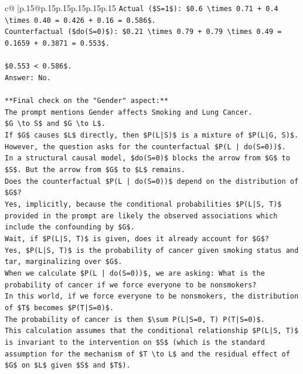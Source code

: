 \documentclass{article}
\begin{document}
{\begin{supertabular}{c@{$\;$}|p{.15\linewidth}@{}p{.15\linewidth}p{.15\linewidth}p{.15\linewidth}p{.15\linewidth}p{.15\linewidth}}
{{{\texttt{Actual (\$S=1\$): \$0.6 \textbackslash{}times 0.71 + 0.4 \textbackslash{}times 0.40 = 0.426 + 0.16 = 0.586\$.} \\
\texttt{Counterfactual (\$do(S=0)\$): \$0.21 \textbackslash{}times 0.79 + 0.79 \textbackslash{}times 0.49 = 0.1659 + 0.3871 = 0.553\$.} \\
\\ 
\texttt{\$0.553 < 0.586\$.} \\
\texttt{Answer: No.} \\
\\ 
\texttt{**Final check on the "Gender" aspect:**} \\
\texttt{The prompt mentions Gender affects Smoking and Lung Cancer.} \\
\texttt{\$G \textbackslash{}to S\$ and \$G \textbackslash{}to L\$.} \\
\texttt{If \$G\$ causes \$L\$ directly, then \$P(L|S)\$ is a mixture of \$P(L|G, S)\$.} \\
\texttt{However, the question asks for the counterfactual \$P(L | do(S=0))\$.} \\
\texttt{In a structural causal model, \$do(S=0)\$ blocks the arrow from \$G\$ to \$S\$. But the arrow from \$G\$ to \$L\$ remains.} \\
\texttt{Does the counterfactual \$P(L | do(S=0))\$ depend on the distribution of \$G\$?} \\
\texttt{Yes, implicitly, because the conditional probabilities \$P(L|S, T)\$ provided in the prompt are likely the observed associations which include the confounding by \$G\$.} \\
\texttt{Wait, if \$P(L|S, T)\$ is given, does it already account for \$G\$?} \\
\texttt{Yes, \$P(L|S, T)\$ is the probability of cancer given smoking status and tar, marginalizing over \$G\$.} \\
\texttt{When we calculate \$P(L | do(S=0))\$, we are asking: What is the probability of cancer if we force everyone to be nonsmokers?} \\
\texttt{In this world, if we force everyone to be nonsmokers, the distribution of \$T\$ becomes \$P(T|S=0)\$.} \\
\texttt{The probability of cancer is then \$\textbackslash{}sum P(L|S=0, T) P(T|S=0)\$.} \\
\texttt{This calculation assumes that the conditional relationship \$P(L|S, T)\$ is invariant to the intervention on \$S\$ (which is the standard assumption for the mechanism of \$T \textbackslash{}to L\$ and the residual effect of \$G\$ on \$L\$ given \$S\$ and \$T\$).} \\
}}}
\end{supertabular}}
\end{document}
